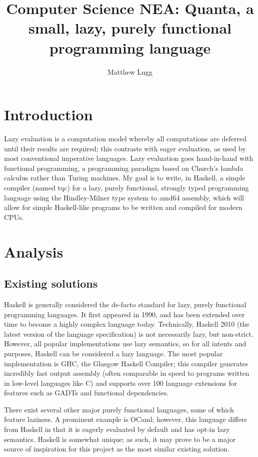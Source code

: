 \documentclass[9pt]{extarticle}
\title{Computer Science NEA: Quanta, a small, lazy, purely functional programming language}
\author{Matthew Lugg}
\begin{document}
\maketitle

\newpage

\tableofcontents

\newpage

\section{Introduction}

Lazy evaluation is a computation model whereby all computations are
deferred until their results are required; this contrasts with eager
evaluation, as used by most conventional imperative languages. Lazy
evaluation goes hand-in-hand with functional programming, a programming
paradigm based on Church's lambda calculus rather than Turing machines.
My goal is to write, in Haskell, a simple compiler (named tqc) for a
lazy, purely functional, strongly typed programming language using the
Hindley-Milner type system to amd64 assembly, which will allow for
simple Haskell-like programs to be written and compiled for modern CPUs.

\section{Analysis}

\subsection{Existing solutions}

Haskell is generally considered the de-facto standard for lazy, purely
functional programming languages. It first appeared in 1990, and has been
extended over time to become a highly complex language today. Technically,
Haskell 2010 (the latest version of the language specification) is not
necessarily lazy, but non-strict. However, all popular implementations use lazy
semantics, so for all intents and purposes, Haskell can be considered a lazy
language. The most popular implementation is GHC, the Glasgow Haskell Compiler;
this compiler generates incredibly fast output assembly (often comparable in
speed to programs written in low-level languages like C) and supports over 100
language extensions for features such as GADTs and functional dependencies.

There exist several other major purely functional languages, some of which
feature laziness. A prominent example is OCaml; however, this language differs
from Haskell in that it is eagerly evaluated by default and has opt-in lazy
semantics. Haskell is somewhat unique; as such, it may prove to be a major
source of inspiration for this project as the most similar existing solution.
\end{document}
